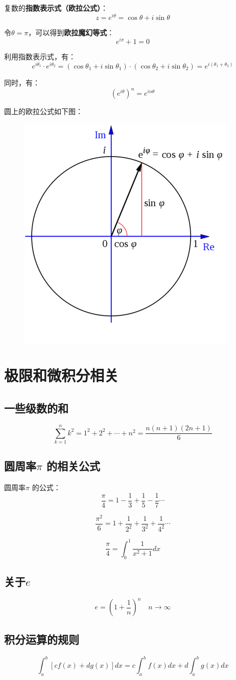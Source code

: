 \documentclass[12pt]{article}
\begin{document}
复数的\textbf{指数表示式（欧拉公式）}：
$$
z = e^{i\theta} = \cos\theta + i\sin\theta
$$

令$\theta=\pi$，可以得到\textbf{欧拉魔幻等式}：
$$
e^{i\pi} + 1 = 0
$$

利用指数表示式，有：
$$
e^{i\theta_1} \cdot e^{i\theta_2} = (\cos\theta_1 + i\sin\theta_1)\cdot(\cos\theta_2 + i\sin\theta_2) = e^{i(\theta_1+\theta_2)}
$$

同时，有：
$$
(e^{i\theta})^n = e^{in\theta}
$$

圆上的欧拉公式如下图：
\begin{figure}[H]
  \centering
  \includegraphics[width=.3\textwidth]{fig/EulerEquationInCircle.png} 
\end{figure}

\section{极限和微积分相关}
\subsection{一些级数的和}
$$
\sum_{k=1}^{n}k^2 = 1^2 + 2^2 + \cdots + n^2 = \frac{n(n+1)(2n+1)}{6}
$$

\subsection{圆周率$\pi$ 的相关公式}
圆周率$\pi$ 的公式：
$$
    \frac{\pi}{4} = 1 - \frac{1}{3} + \frac{1}{5} - \frac{1}{7} \cdots
$$

$$
    \frac{\pi^2}{6} = 1 + \frac{1}{2^2} + \frac{1}{3^2} + \frac{1}{4^2} \cdots
$$

$$
\frac{\pi}{4} = \int_0^1\frac{1}{x^2+1}dx
$$

\subsection{关于$e$}
$$
e = (1 + \frac{1}{n})^n \quad n \to \infty
$$

\subsection{积分运算的规则}
$$
\int_a^b[cf(x) + dg(x)]dx = c\int_a^bf(x)dx + d\int_a^bg(x)dx
$$
\end{document}
